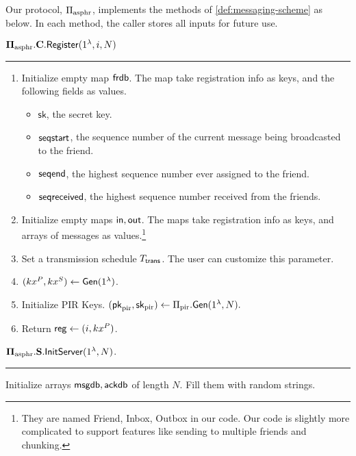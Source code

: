 \begin{definition}
Our protocol, $\Pi_{\text{asphr}}$, implements the methods of \cref{def:messaging-scheme} as below. In each method, the caller stores all inputs for future use.
\vspace{10pt}

$\mathbf{\Pi_{\text{asphr}}.C.\mathsf{Register}}(1^{\lambda}, i, N)$
\vspace{5pt}
\hrule
\vspace{5pt}
\begin{enumerate}
    \item Initialize empty map $\mathsf{frdb}$. The map take registration info as keys, and the following fields as values.
    \begin{itemize}
        \item $\mathsf{sk}$, the secret key.
        \item $\mathsf{seqstart}$, the sequence number of the current message being broadcasted to the friend.
        \item $\mathsf{seqend}$, the highest sequence number ever assigned to the friend.
        \item $\mathsf{seqreceived}$, the highest sequence number received from the friends.
    \end{itemize}
    \item Initialize empty maps $\mathsf{in}, \mathsf{out}$. The maps take registration info as keys, and arrays of messages as values.\footnote{They are named Friend, Inbox, Outbox in our code. Our code is slightly more complicated to support features like sending to multiple friends and chunking.}
    \item Set a transmission schedule $T_{\mathsf{trans}}$. The user can customize this parameter.
    \item $(kx^P, kx^S) \leftarrow \mathsf{Gen}(1^{\lambda})$. 
    \item Initialize PIR Keys. $(\mathsf{pk}_{\text{pir}}, {\mathsf{sk}}_{\text{pir}}) \leftarrow \Pi_{\text{pir}}.\mathsf{Gen}(1^{\lambda}, N).$
    \item Return $\mathsf{reg} \leftarrow (i, kx^P)$.
\end{enumerate}
\vspace{10pt}
$\mathbf{\Pi_{\text{asphr}}.S.\mathsf{InitServer}}(1^{\lambda}, N)$.
\vspace{5pt}
\hrule
\vspace{5pt}
Initialize arrays $\mathsf{msgdb}, \mathsf{ackdb}$ of length $N$. Fill them with random strings.


\end{definition}
